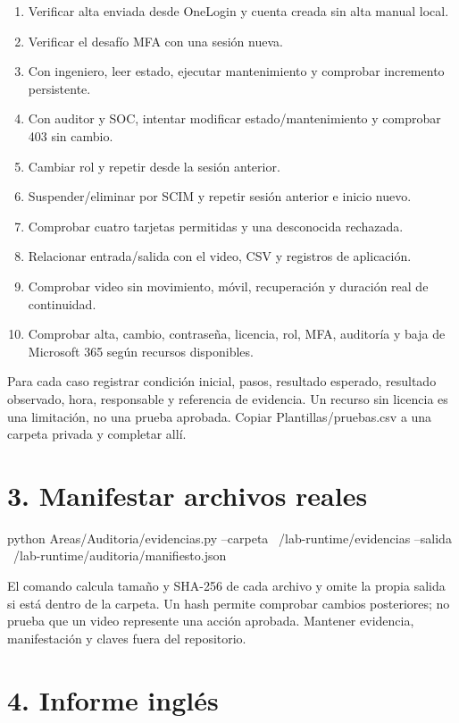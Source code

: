 \documentclass[12pt,a4paper]{article}
\begin{document}
\begin{enumerate}
\item Verificar alta enviada desde OneLogin y cuenta creada sin alta manual local.
\item Verificar el desafío MFA con una sesión nueva.
\item Con ingeniero, leer estado, ejecutar mantenimiento y comprobar incremento persistente.
\item Con auditor y SOC, intentar modificar estado/mantenimiento y comprobar 403 sin cambio.
\item Cambiar rol y repetir desde la sesión anterior.
\item Suspender/eliminar por SCIM y repetir sesión anterior e inicio nuevo.
\item Comprobar cuatro tarjetas permitidas y una desconocida rechazada.
\item Relacionar entrada/salida con el video, CSV y registros de aplicación.
\item Comprobar video sin movimiento, móvil, recuperación y duración real de continuidad.
\item Comprobar alta, cambio, contraseña, licencia, rol, MFA, auditoría y baja de Microsoft 365 según recursos disponibles.
\end{enumerate}
Para cada caso registrar condición inicial, pasos, resultado esperado, resultado observado, hora, responsable y referencia de evidencia. Un recurso sin licencia es una limitación, no una prueba aprobada. Copiar Plantillas/pruebas.csv a una carpeta privada y completar allí.\par
{}\section*{3. Manifestar archivos reales}
\begin{Comandos}
python Areas/Auditoria/evidencias.py --carpeta ~/lab-runtime/evidencias --salida ~/lab-runtime/auditoria/manifiesto.json
\end{Comandos}
El comando calcula tamaño y SHA-256 de cada archivo y omite la propia salida si está dentro de la carpeta. Un hash permite comprobar cambios posteriores; no prueba que un video represente una acción aprobada. Mantener evidencia, manifestación y claves fuera del repositorio.\par
{}\section*{4. Informe inglés}
\end{document}
